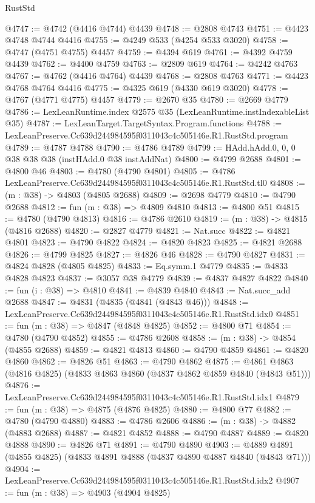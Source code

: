 \begin{lexlean}{RustStd}
\begin{coremodule}
@4747 := @4742 (@4416 @4744) @4439
@4748 := @2808 @4743
@4751 := @4423 @4748 @4744 @4416
@4755 := @4249 @533 (@4254 @533 @3020)
@4758 := @4747 (@4751 @4755) @4457
@4759 := @4394 @619
@4761 := @4392 @4759 @4439
@4762 := @4400 @4759
@4763 := @2809 @619
@4764 := @4242 @4763
@4767 := @4762 (@4416 @4764) @4439
@4768 := @2808 @4763
@4771 := @4423 @4768 @4764 @4416
@4775 := @4325 @619 (@4330 @619 @3020)
@4778 := @4767 (@4771 @4775) @4457
@4779 := @2670 @35
@4780 := @2669 @4779
@4786 := LexLeanRuntime.index @2575 @35 (LexLeanRuntime.instIndexableList @35)
@4787 := LexLeanTarget.TargetSyntax.Program.functions
@4788 := LexLeanPreserve.Cc639d244984595f0311043c4c505146e.R1.RustStd.program
@4789 := @4787 @4788
@4790 := @4786 @4789
@4799 := HAdd.hAdd.{0, 0, 0} @38 @38 @38 (instHAdd.{0} @38 instAddNat)
@4800 := @4799 @2688
@4801 := @4800 @46
@4803 := @4780 (@4790 @4801)
@4805 := @4786 LexLeanPreserve.Cc639d244984595f0311043c4c505146e.R1.RustStd.tl0
@4808 := (m : @38) -> @4803 (@4805 @2688)
@4809 := @2698 @4779
@4810 := @4790 @2688
@4812 := fun (m : @38) => @4809 @4810
@4813 := @4800 @51
@4815 := @4780 (@4790 @4813)
@4816 := @4786 @2610
@4819 := (m : @38) -> @4815 (@4816 @2688)
@4820 := @2827 @4779
@4821 := Nat.succ
@4822 := @4821 @4801
@4823 := @4790 @4822
@4824 := @4820 @4823
@4825 := @4821 @2688
@4826 := @4799 @4825
@4827 := @4826 @46
@4828 := @4790 @4827
@4831 := @4824 @4828 (@4805 @4825)
@4833 := Eq.symm.{1} @4779
@4835 := @4833 @4828 @4823
@4837 := @3057 @38 @4779
@4839 := @4837 @4827 @4822
@4840 := fun (i : @38) => @4810
@4841 := @4839 @4840
@4843 := Nat.succ_add @2688
@4847 := @4831 (@4835 (@4841 (@4843 @46)))
@4848 := LexLeanPreserve.Cc639d244984595f0311043c4c505146e.R1.RustStd.idx0
@4851 := fun (m : @38) => @4847 (@4848 @4825)
@4852 := @4800 @71
@4854 := @4780 (@4790 @4852)
@4855 := @4786 @2608
@4858 := (m : @38) -> @4854 (@4855 @2688)
@4859 := @4821 @4813
@4860 := @4790 @4859
@4861 := @4820 @4860
@4862 := @4826 @51
@4863 := @4790 @4862
@4875 := @4861 @4863 (@4816 @4825) (@4833 @4863 @4860 (@4837 @4862 @4859 @4840 (@4843 @51)))
@4876 := LexLeanPreserve.Cc639d244984595f0311043c4c505146e.R1.RustStd.idx1
@4879 := fun (m : @38) => @4875 (@4876 @4825)
@4880 := @4800 @77
@4882 := @4780 (@4790 @4880)
@4883 := @4786 @2606
@4886 := (m : @38) -> @4882 (@4883 @2688)
@4887 := @4821 @4852
@4888 := @4790 @4887
@4889 := @4820 @4888
@4890 := @4826 @71
@4891 := @4790 @4890
@4903 := @4889 @4891 (@4855 @4825) (@4833 @4891 @4888 (@4837 @4890 @4887 @4840 (@4843 @71)))
@4904 := LexLeanPreserve.Cc639d244984595f0311043c4c505146e.R1.RustStd.idx2
@4907 := fun (m : @38) => @4903 (@4904 @4825)

\end{coremodule}
\end{lexlean}
